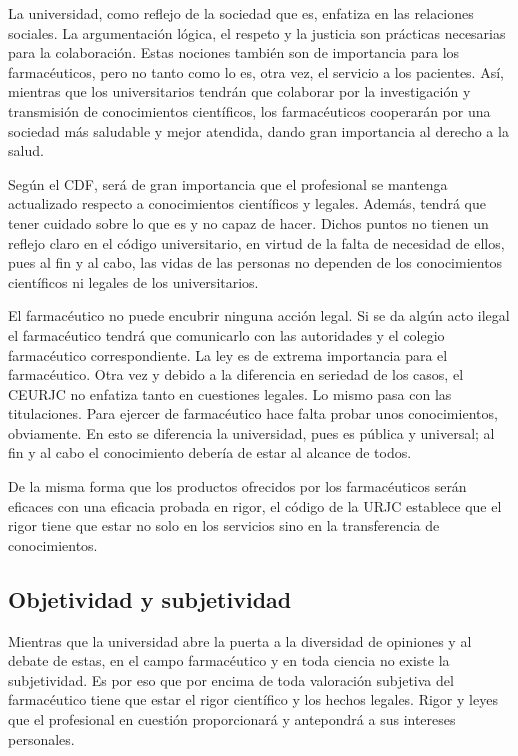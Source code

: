 \documentclass[11pt,a4paper]{article}
\begin{document}
La universidad, como reflejo de la sociedad que es, enfatiza en las relaciones sociales. La argumentación lógica, el respeto y la justicia son prácticas necesarias para la colaboración. Estas nociones también son de importancia para los farmacéuticos, pero no tanto como lo es, otra vez, el servicio a los pacientes. Así, mientras que los universitarios tendrán que colaborar por la investigación y transmisión de conocimientos científicos, los farmacéuticos cooperarán por una sociedad más saludable y mejor atendida, dando gran importancia al derecho a la salud. 

Según el CDF, será de gran importancia que el profesional se mantenga actualizado respecto a conocimientos científicos y legales. Además, tendrá que tener cuidado sobre lo que es y no capaz de hacer. Dichos puntos no tienen un reflejo claro en el código universitario, en virtud de la falta de necesidad de ellos, pues al fin y al cabo, las vidas de las personas no dependen de los conocimientos científicos ni legales de los universitarios. 

 	El farmacéutico no puede encubrir ninguna acción legal. Si se da algún acto ilegal el farmacéutico tendrá que comunicarlo con las autoridades y el colegio farmacéutico correspondiente. La ley es de extrema importancia para el farmacéutico. Otra vez y debido a la diferencia en seriedad de los casos, el CEURJC no enfatiza tanto en cuestiones legales. Lo mismo pasa con las titulaciones. Para ejercer de farmacéutico hace falta probar unos conocimientos, obviamente. En esto se diferencia la universidad, pues es pública y universal; al fin y al cabo el conocimiento debería de estar al alcance de todos. 

De la misma forma que los productos ofrecidos por los farmacéuticos serán eficaces con una eficacia probada en rigor, el código de la URJC establece que el rigor tiene que estar no solo en los servicios sino en la transferencia de conocimientos.	

\subsection{Objetividad y subjetividad}
Mientras que la universidad abre la puerta a la diversidad de opiniones y al debate de estas, en el campo farmacéutico y en toda ciencia no existe la subjetividad. Es por eso que por encima de toda valoración subjetiva del farmacéutico tiene que estar el rigor científico y los hechos legales. Rigor y leyes que el profesional en cuestión proporcionará y antepondrá a sus intereses personales. 
\end{document}
